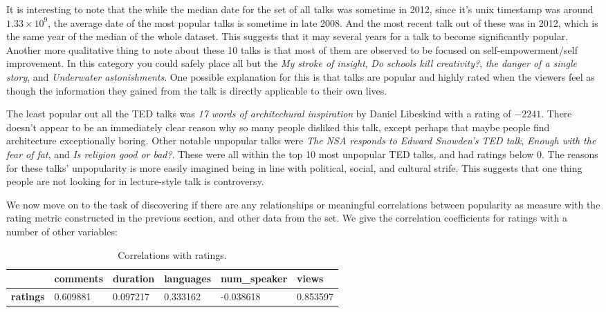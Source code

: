 \documentclass[11pt,oneside,reqno]{amsart}
\theoremstyle{plain}
\theoremstyle{definition}
\theoremstyle{remark}
\newcommand{\ra}[1]{\renewcommand{\arraystretch}{#1}}
\begin{document}
It is interesting to note that the while the median date for the set of all talks was sometime in 2012, since it's unix timestamp was around $1.33 \times 10^9$, the average date of the most popular talks is sometime in late 2008. And the most recent talk out of these was in 2012, which is the same year of the median of the whole dataset. This suggests that it may several years for a talk to become significantly popular. Another more qualitative thing to note about these 10 talks is that most of them are observed to be focused on self-empowerment/self improvement. In this category you could safely place all but the \textit{My stroke of insight}, \textit{Do schools kill creativity?}, \textit{the danger of a single story}, and \textit{Underwater astonishments}. One possible explanation for this is that talks are popular and highly rated when the viewers feel as though the information they gained from the talk is directly applicable to their own lives. 

The least popular out all the TED talks was \textit{17 words of architechural inspiration} by Daniel Libeskind with a rating of $-2241$. There doesn't appear to be an immediately clear reason why so many people disliked this talk, except perhaps that maybe people find architecture exceptionally boring. Other notable unpopular talks were \textit{The NSA responds to Edward Snowden's TED talk}, \textit{Enough with the fear of fat}, and \textit{Is religion good or bad?}. These were all within the top 10 most unpopular TED talks, and had ratings below 0.  The reasons for these talks' unpopularity is more easily imagined being in line with political, social, and cultural strife. This suggests that one thing people are not looking for in lecture-style talk is controversy. 

We now move on to the task of discovering if there are any relationships or meaningful correlations between popularity as measure with the rating metric constructed in the previous section, and other data from the set. We give the correlation coefficients for ratings with a number of other variables:

 \begin{table}[H]\label{table5}\centering
 \begin{adjustbox}{center}
\ra{1.2}
\begin{tabular}{@{}llllll@{}}\toprule[1.7pt]

    \multicolumn{1}{c}{} & \multicolumn{1}{p{5.18em}}{\textbf{comments}} & \multicolumn{1}{p{4.045em}}{\textbf{duration}} & \multicolumn{1}{p{5.32em}}{\textbf{languages}} & \multicolumn{1}{p{6.975em}}{\textbf{num\_speaker}} & \multicolumn{1}{p{3.045em}}{\textbf{views}} \\
    \midrule
    \textbf{ratings} & 0.609881 & 0.097217 & 0.333162 & -0.038618    & 0.853597 \\
    \bottomrule[1.7pt]
    \end{tabular} 
    \vspace{3mm} 

  \end{adjustbox}\caption{Correlations with ratings. }
\end{table}%
\end{document}
